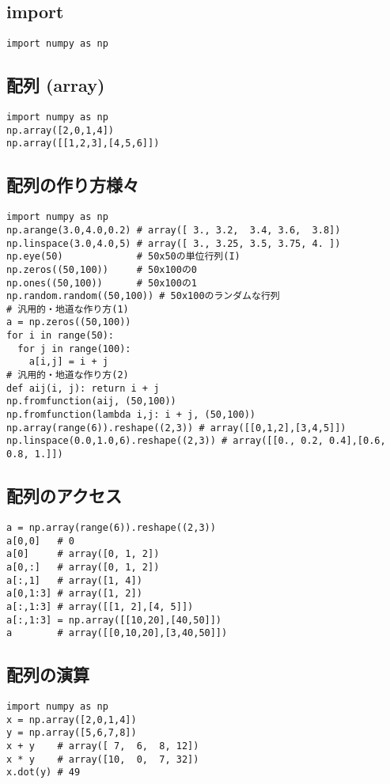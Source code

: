 \documentclass[landscape,7pt,dvipdfmx]{article}
\begin{document}
\begin{multicols*}{3}
\subsection{import}
\begin{lstlisting}
import numpy as np
\end{lstlisting}

\subsection{配列 (array)}
\begin{lstlisting}
import numpy as np
np.array([2,0,1,4])
np.array([[1,2,3],[4,5,6]])
\end{lstlisting}

\subsection{配列の作り方様々}
\begin{lstlisting}
import numpy as np
np.arange(3.0,4.0,0.2) # array([ 3., 3.2,  3.4, 3.6,  3.8])
np.linspace(3.0,4.0,5) # array([ 3., 3.25, 3.5, 3.75, 4. ])
np.eye(50)             # 50x50の単位行列(I)
np.zeros((50,100))     # 50x100の0
np.ones((50,100))      # 50x100の1
np.random.random((50,100)) # 50x100のランダムな行列
# 汎用的・地道な作り方(1)
a = np.zeros((50,100))
for i in range(50):
  for j in range(100):
    a[i,j] = i + j
# 汎用的・地道な作り方(2)
def aij(i, j): return i + j
np.fromfunction(aij, (50,100))
np.fromfunction(lambda i,j: i + j, (50,100))
np.array(range(6)).reshape((2,3)) # array([[0,1,2],[3,4,5]])
np.linspace(0.0,1.0,6).reshape((2,3)) # array([[0., 0.2, 0.4],[0.6, 0.8, 1.]])
\end{lstlisting}

\subsection{配列のアクセス}
\begin{lstlisting}
a = np.array(range(6)).reshape((2,3))
a[0,0]   # 0
a[0]     # array([0, 1, 2])
a[0,:]   # array([0, 1, 2])
a[:,1]   # array([1, 4])
a[0,1:3] # array([1, 2])
a[:,1:3] # array([[1, 2],[4, 5]])
a[:,1:3] = np.array([[10,20],[40,50]])
a        # array([[0,10,20],[3,40,50]])
\end{lstlisting}

\subsection{配列の演算}
\begin{lstlisting}
import numpy as np
x = np.array([2,0,1,4])
y = np.array([5,6,7,8])
x + y    # array([ 7,  6,  8, 12])
x * y    # array([10,  0,  7, 32])
x.dot(y) # 49
\end{lstlisting}


\end{multicols*}
\end{document}
